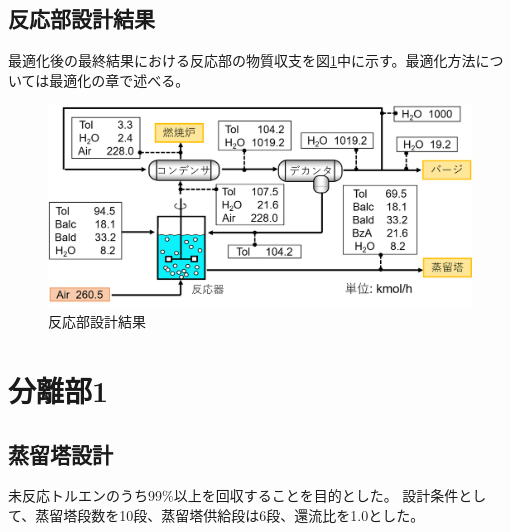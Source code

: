 \documentclass[a4j]{jsreport}
\begin{document}
\section{反応部設計結果}
最適化後の最終結果における反応部の物質収支を図\ref{反応部設計結果の図}中に示す。最適化方法については最適化の章で述べる。
\begin{figure}[h]
    \begin{center}
        \includegraphics[scale=0.7]{ReactionSectionConclusion.png}
        \caption{反応部設計結果}
        \label{反応部設計結果の図}
    \end{center}
\end{figure}


\newpage
\chapter{分離部1}
\section{蒸留塔設計}
未反応トルエンのうち99\%以上を回収することを目的とした。
設計条件として、蒸留塔段数を10段、蒸留塔供給段は6段、還流比を1.0とした。
\end{document}
